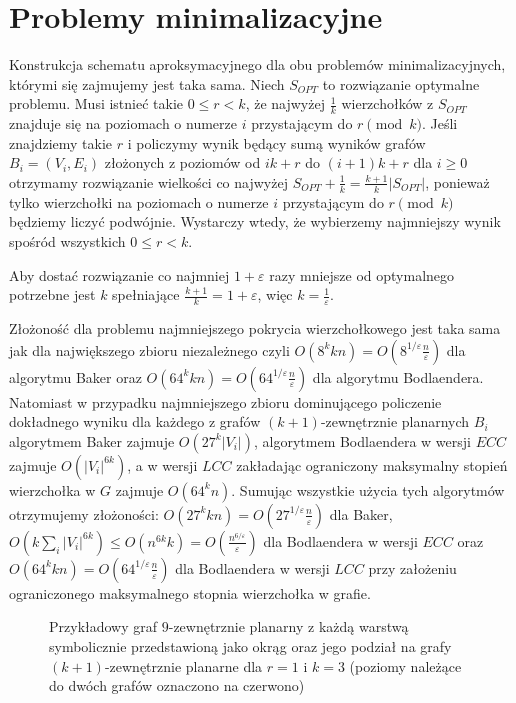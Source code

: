 \documentclass[twoside,a4paper,12pt]{report} %
\theoremstyle{break}
\begin{document}
\section{Problemy minimalizacyjne}
Konstrukcja schematu aproksymacyjnego dla obu problemów minimalizacyjnych, którymi się zajmujemy jest taka sama. Niech $S_{OPT}$ to rozwiązanie optymalne problemu. Musi istnieć takie $0 \le r < k$, że najwyżej $\frac{1}{k}$ wierzchołków z $S_{OPT}$ znajduje się na poziomach o numerze $i$ przystającym do $r \pmod{k}$. Jeśli znajdziemy takie $r$ i policzymy wynik będący sumą wyników grafów $B_i=(V_i,E_i)$ złożonych z poziomów od $ik + r$ do $(i+1)k + r$ dla $i\ge 0$ otrzymamy rozwiązanie wielkości co najwyżej $S_{OPT} + \frac{1}{k}=\frac{k+1}{k}|S_{OPT}|$, ponieważ tylko wierzchołki na poziomach o numerze $i$ przystającym do $r\pmod{k}$ będziemy liczyć podwójnie. Wystarczy wtedy, że wybierzemy najmniejszy wynik spośród wszystkich $0\le r < k$.

Aby dostać rozwiązanie co  najmniej $1+\varepsilon$ razy mniejsze od optymalnego potrzebne jest $k$ spełniające $\frac{k+1}{k}=1+\varepsilon$, więc $k=\frac{1}{\varepsilon}$.

Złożoność dla problemu najmniejszego pokrycia wierzchołkowego jest taka sama jak dla największego zbioru niezależnego czyli $O(8^kkn)=O(8^{1/\varepsilon}\frac{n}{\varepsilon})$ dla algorytmu Baker oraz $O(64^kkn)=O(64^{1/\varepsilon}\frac{n}{\varepsilon})$ dla algorytmu Bodlaendera. Natomiast w przypadku najmniejszego zbioru dominującego policzenie dokładnego wyniku dla każdego z grafów $(k+1)$-zewnętrznie planarnych $B_i$ algorytmem Baker zajmuje $O(27^k|V_i|)$, algorytmem Bodlaendera w wersji $ECC$ zajmuje $O(|V_i|^{6k})$, a w wersji $LCC$ zakładając ograniczony maksymalny stopień wierzchołka w $G$ zajmuje $O(64^kn)$. Sumując wszystkie użycia tych algorytmów otrzymujemy złożoności: $O(27^kkn)=O(27^{1/\varepsilon}\frac{n}{\varepsilon})$ dla Baker, $O(k\sum_i|V_i|^{6k})\le O(n^{6k}k)=O(\frac{n^{6/\varepsilon}}{\varepsilon})$ dla Bodlaendera w wersji $ECC$ oraz $O(64^kkn)=O(64^{1/\varepsilon}\frac{n}{\varepsilon})$ dla Bodlaendera w wersji $LCC$ przy założeniu ograniczonego maksymalnego stopnia wierzchołka w grafie.

\begin{figure}[ht]
    \centering
    
    \caption{Przykładowy graf $9$-zewnętrznie planarny z każdą warstwą symbolicznie przedstawioną jako okrąg oraz jego podział na grafy $(k+1)$-zewnętrznie planarne dla $r=1$ i $k=3$ (poziomy należące do dwóch grafów oznaczono na czerwono)}
    \label{min_problem}
\end{figure}
\end{document}
